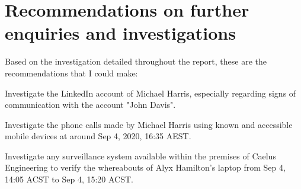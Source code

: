 \section{Recommendations on further enquiries and investigations} %
\label{sec:Recommendations on further enquiries and investigations}

Based on the investigation detailed throughout the report, these are the recommendations that I could make:

\begin{myenum}
    \item Investigate the LinkedIn account of Michael Harris, especially regarding signs of communication with the account "John Davis".
    \item Investigate the phone calls made by Michael Harris using known and accessible mobile devices at around Sep 4, 2020, 16:35 AEST.
    \item Investigate any surveillance system available within the premises of Caelus Engineering to verify the whereabouts of Alyx Hamilton's laptop from Sep 4, 14:05 ACST to Sep 4, 15:20 ACST.
\end{myenum}

